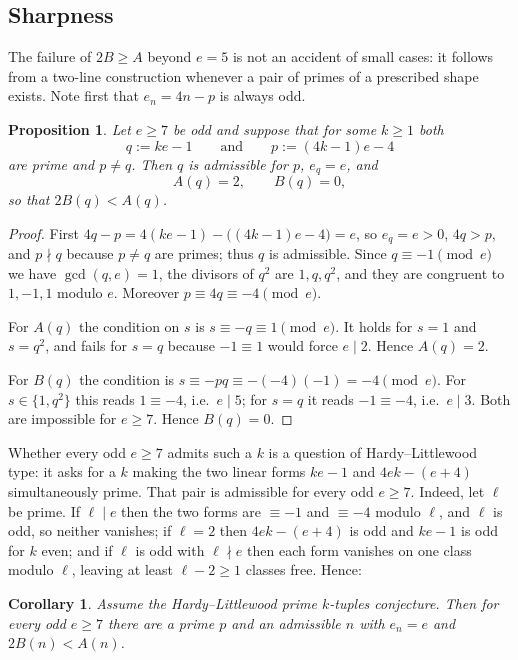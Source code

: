 \documentclass[11pt,reqno]{amsart}
\theoremstyle{plain}
\newtheorem{proposition}[theorem]{Proposition}
\newtheorem{corollary}[theorem]{Corollary}
\theoremstyle{definition}
\numberwithin{equation}{section}
\begin{document}
\subsection{Sharpness}\label{sec:sharp}
The failure of $2B\ge A$ beyond $e=5$ is not an accident of small cases: it follows
from a two-line construction whenever a pair of primes of a prescribed shape exists.
Note first that $e_{n}=4n-p$ is always odd.

\begin{proposition}\label{prop:sharpconstr}
Let $e\ge7$ be odd and suppose that for some $k\ge1$ both
\[
  q:=ke-1\qquad\text{and}\qquad p:=(4k-1)e-4
\]
are prime and $p\ne q$. Then $q$ is admissible for $p$, $e_{q}=e$, and
\[
  A(q)=2,\qquad B(q)=0,
\]
so that $2B(q)<A(q)$.
\end{proposition}

\begin{proof}
First $4q-p=4(ke-1)-\bigl((4k-1)e-4\bigr)=e$, so $e_{q}=e>0$, $4q>p$, and $p\nmid q$
because $p\ne q$ are primes; thus $q$ is admissible. Since $q\equiv-1\pmod e$ we have
$\gcd(q,e)=1$, the divisors of $q^{2}$ are $1,q,q^{2}$, and they are congruent to
$1,-1,1$ modulo $e$. Moreover $p\equiv4q\equiv-4\pmod e$.

For $A(q)$ the condition on $s$ is $s\equiv-q\equiv1\pmod e$. It holds for $s=1$ and
$s=q^{2}$, and fails for $s=q$ because $-1\equiv1$ would force $e\mid2$. Hence
$A(q)=2$.

For $B(q)$ the condition is $s\equiv-pq\equiv-(-4)(-1)=-4\pmod e$. For $s\in\{1,q^{2}\}$
this reads $1\equiv-4$, i.e.\ $e\mid5$; for $s=q$ it reads $-1\equiv-4$, i.e.\
$e\mid3$. Both are impossible for $e\ge7$. Hence $B(q)=0$.
\end{proof}

Whether every odd $e\ge7$ admits such a $k$ is a question of Hardy--Littlewood type:
it asks for a $k$ making the two linear forms $ke-1$ and $4ek-(e+4)$ simultaneously
prime. That pair is admissible for every odd $e\ge7$. Indeed, let $\ell$ be prime. If
$\ell\mid e$ then the two forms are $\equiv-1$ and $\equiv-4$ modulo $\ell$, and $\ell$
is odd, so neither vanishes; if $\ell=2$ then $4ek-(e+4)$ is odd and $ke-1$ is odd for
$k$ even; and if $\ell$ is odd with $\ell\nmid e$ then each form vanishes on one class
modulo $\ell$, leaving at least $\ell-2\ge1$ classes free. Hence:

\begin{corollary}\label{cor:sharpHL}
Assume the Hardy--Littlewood prime $k$-tuples conjecture. Then for every odd $e\ge7$
there are a prime $p$ and an admissible $n$ with $e_{n}=e$ and $2B(n)<A(n)$.
\end{corollary}
\end{document}
